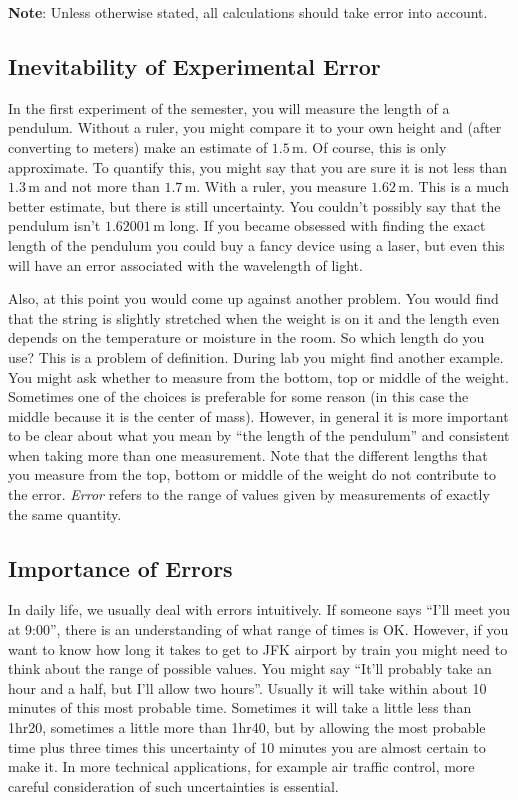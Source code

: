 \textbf{Note}: Unless otherwise stated, all calculations should take error into account.

\subsection{Inevitability of Experimental Error}

In the first experiment of the semester, you will measure the length of a pendulum. Without a ruler, you might compare it to your own height and (after converting to meters) make an estimate of $1.5\,\mathrm{m}$. Of course, this is only approximate. To quantify this, you might say that you are sure it is not less than $1.3\,\mathrm{m}$ and not more than $1.7\,\mathrm{m}$. With a ruler, you measure $1.62\,\mathrm{m}$. This is a much better estimate, but there is still uncertainty. You couldn't possibly say that the pendulum isn't $1.62001\,\mathrm{m}$ long. If you became obsessed with finding the exact length of the pendulum you could buy a fancy device using a laser, but even this will have an error associated with the wavelength of light.\myskip

Also, at this point you would come up against another problem. You would find that the string is slightly stretched when the weight is on it and the length even depends on the temperature or moisture in the room. So which length do you use? This is a problem of definition. During lab you might find another example. You might ask whether to measure from the bottom, top or middle of the weight. Sometimes one of the choices is preferable for some reason (in this case the middle because it is the center of mass). However, in general it is more important to be clear about what you mean by ``the length of the pendulum'' and consistent when taking more than one measurement. Note that the different lengths that you measure from the top, bottom or middle of the weight do not contribute to the error. \emph{Error} refers to the range of values given by measurements of exactly the same quantity.

\subsection{Importance of Errors}

In daily life, we usually deal with errors intuitively. If someone says ``I'll meet you at 9:00'', there is an understanding of what range of times is OK. However, if you want to know how long it takes to get to JFK airport by train you might need to think about the range of possible values. You might say ``It'll probably take an hour and a half, but I'll allow two hours''. Usually it will take within about 10 minutes of this most probable time. Sometimes it will take a little less than 1hr20, sometimes a little more than 1hr40, but by allowing the most probable time plus three times this uncertainty of 10 minutes you are almost certain to make it. In more technical applications, for example air traffic control, more careful consideration of such uncertainties is essential.\myskip

